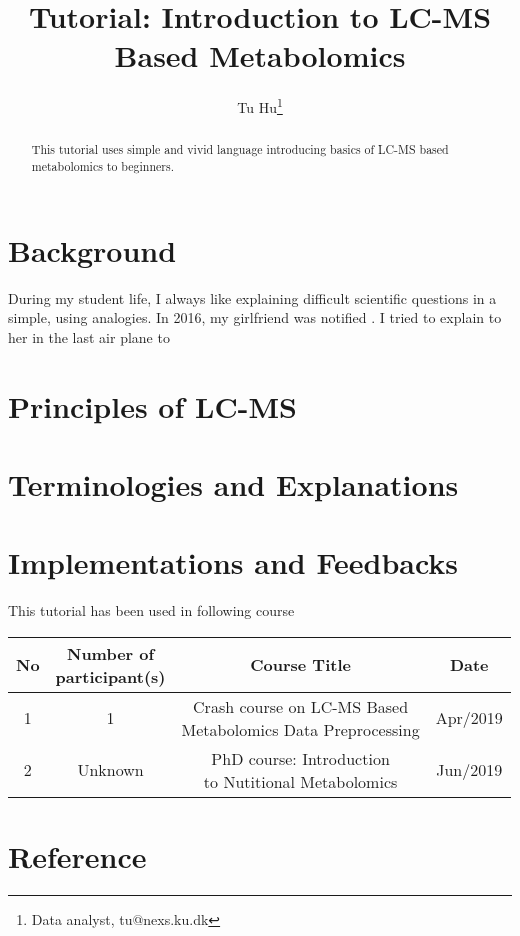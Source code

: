 \documentclass[]{article}
\title{Tutorial: Introduction to LC-MS Based Metabolomics}
\author{Tu Hu\footnote{Data analyst, tu@nexs.ku.dk}}
\begin{document}
\maketitle

\begin{abstract}
This tutorial uses simple and vivid language introducing basics of LC-MS based metabolomics to beginners.
\end{abstract}

\section{Background}
During my student life, I always like explaining difficult scientific questions in a simple, using analogies. 
In 2016, my girlfriend was notified . I tried to explain to her in the last air plane to 

\section{Principles of LC-MS}

\section{Terminologies and Explanations}


\section{Implementations and Feedbacks}
This tutorial has been used in following course

\begin{tabular}{|c|c|c|c|}
	\hline 
	No & \makecell{Number of \\participant(s)} & Course Title & Date \\ 
	\hline 
	1 & 1 & \makecell{Crash course on LC-MS Based \\ Metabolomics Data Preprocessing} & Apr/2019 \\ 
	\hline 
	2 & Unknown & \makecell{PhD course: Introduction\\ to Nutitional Metabolomics} & Jun/2019 \\ 
	\hline 
\end{tabular} 

\section{Reference}
\end{document}
